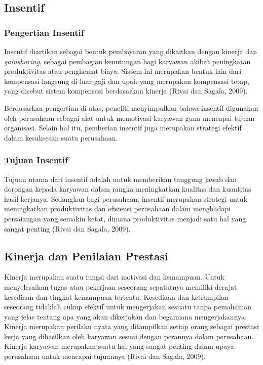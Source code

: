   \subsection{Insentif}
    \subsubsection{Pengertian Insentif}
    Insentif diartikan sebagai bentuk pembayaran yang dikaitkan dengan kinerja dan \emph{gainsharing}, sebagai pembagian keuntungan bagi karyawan akibat peningkatan produktivitas atau penghemat biaya. Sistem ini merupakan bentuk lain dari kompensasi langsung di luar gaji dan upah yang merupakan kompensasi tetap, yang disebut sistem kompensasi berdasarkan kinerja (Rivai dan Sagala, 2009).
    
    Berdasarkan pengertian di atas, peneliti menyimpulkan bahwa insentif digunakan oleh perusahaan sebagai alat untuk memotivasi karyawan guna mencapai tujuan organisasi. Selain hal itu, pemberian insentif juga merupakan strategi efektif dalam kesuksesan suatu perusahaan.
    
    \subsubsection{Tujuan Insentif}
    Tujuan utama dari insentif adalah untuk memberikan tanggung jawab dan dorongan kepada karyawan dalam rangka meningkatkan kualitas dan kuantitas hasil kerjanya. Sedangkan bagi perusahaan, insentif merupakan strategi untuk meningkatkan produktivitas dan efisiensi perusahaan dalam menghadapi persaiangan yang semakin ketat, dimana produktivitas menjadi satu hal yang sangat penting (Rivai dan Sagala, 2009).
    
\subsection{Kinerja dan Penilaian Prestasi}
Kinerja merupakan suatu fungsi dari motivasi dan kemampuan. Untuk menyelesaikan tugas atau pekerjaan seseorang sepatutnya memiliki derajat kesediaan dan tingkat kemampuan tertentu. Kesediaan dan ketrampilan seseorang tidaklah cukup efektif untuk mengerjakan sesuatu tanpa pemahaman yang jelas tentang apa yang akan dikerjakan dan begaimana mengerjakannya. Kinerja merupakan perilaku nyata yang ditampilkan setiap orang sebagai prestasi kerja yang dihasilkan oleh karyawan sesuai dengan perannya dalam perusahaan. Kinerja karyawan merupakan suatu hal yang sangat penting dalam upaya perusahaan untuk mencapai tujuannya (Rivai dan Sagala, 2009).
    
